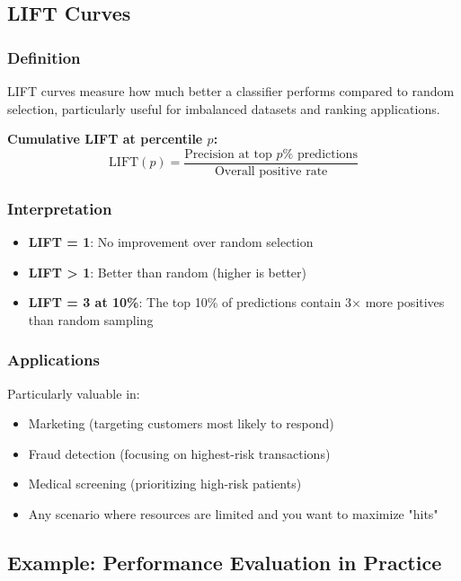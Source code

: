 \documentclass[12pt,a4paper]{article}
\begin{document}
\subsection{LIFT Curves}

\subsubsection{Definition}

LIFT curves measure how much better a classifier performs compared to random selection, particularly useful for imbalanced datasets and ranking applications.

\textbf{Cumulative LIFT at percentile $p$:}
\begin{equation}
\text{LIFT}(p) = \frac{\text{Precision at top } p\% \text{ predictions}}{\text{Overall positive rate}}
\end{equation}

\subsubsection{Interpretation}

\begin{itemize}
    \item \textbf{LIFT = 1}: No improvement over random selection
    \item \textbf{LIFT > 1}: Better than random (higher is better)
    \item \textbf{LIFT = 3 at 10\%}: The top 10\% of predictions contain 3× more positives than random sampling
\end{itemize}

\subsubsection{Applications}

Particularly valuable in:
\begin{itemize}
    \item Marketing (targeting customers most likely to respond)
    \item Fraud detection (focusing on highest-risk transactions)  
    \item Medical screening (prioritizing high-risk patients)
    \item Any scenario where resources are limited and you want to maximize "hits"
\end{itemize}

\subsection{Example: Performance Evaluation in Practice}
\end{document}
